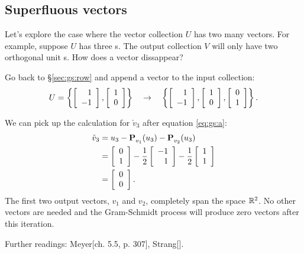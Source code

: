 \subsection{Superfluous vectors}
Let's explore the case where the vector collection $U$ has two many vectors. For example, suppose $U$ has three \vv s. The output collection $V$ will only have two orthogonal unit \vv s. How does a vector dissappear?

Go back to \S\eqref{sec:gs:row} and append a vector to the input collection:
\begin{equation}
  U = \lst{
  \mat{r}{1\\-1},
  \mat{r}{1\\0}
  }
  \quad \rightarrow \quad
  \lst{
  \mat{r}{1\\-1},
  \mat{r}{1\\0},
  \mat{r}{0\\1}
  }.
\end{equation}

We can pick up the calculation for $\check{v}_{3}$ after equation \eqref{eq:gs:a}:
\begin{equation}
  \begin{split}
    \check{v}_{3} &= u_{3} - \pee{}_{v_{1}}(u_{3}) - \pee{}_{v_{2}}(u_{3})\\
    & = \mat{c}{0\\1} - \rtwo\mat{r}{-1\\1} - \rtwo\mat{c}{1\\1}\\
    & = \mat{r}{0\\0}.
  \end{split}
\end{equation}
The first two output vectors, $v_{1}$ and $v_{2}$, completely span the space $\real{2}$. No other vectors are needed and the Gram-Schmidt process will produce zero vectors after this iteration.

Further readings: Meyer[ch. 5.5, p. 307]{}, Strang[]{}.


\endinput